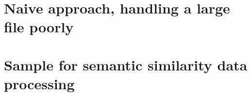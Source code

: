 \appendix
\section{Naive approach, handling a large file poorly}
\label{appendix:A}


\section{Sample for semantic similarity data processing}
\label{appendix:sample_table}
